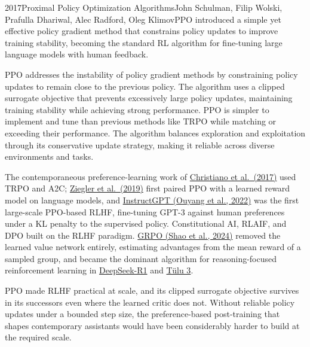 
\begin{papersummary}{2017}{Proximal Policy Optimization Algorithms}{John Schulman, Filip Wolski, Prafulla Dhariwal, Alec Radford, Oleg Klimov}{PPO introduced a simple yet effective policy gradient method that constrains policy updates to improve training stability, becoming the standard RL algorithm for fine-tuning large language models with human feedback.}

PPO addresses the instability of policy gradient methods by constraining policy updates to remain close to the previous policy. The algorithm uses a clipped surrogate objective that prevents excessively large policy updates, maintaining training stability while achieving strong performance. PPO is simpler to implement and tune than previous methods like TRPO while matching or exceeding their performance. The algorithm balances exploration and exploitation through its conservative update strategy, making it reliable across diverse environments and tasks.

The contemporaneous preference-learning work of \hyperref[paper:christiano-2017-rlhf]{Christiano et al.\ (2017)} used TRPO and A2C; \hyperref[paper:ziegler-2019]{Ziegler et al.\ (2019)} first paired PPO with a learned reward model on language models, and \hyperref[paper:ouyang-2022]{InstructGPT (Ouyang et al., 2022)} was the first large-scale PPO-based RLHF, fine-tuning GPT-3 against human preferences under a KL penalty to the supervised policy. Constitutional AI, RLAIF, and DPO built on the RLHF paradigm. \hyperref[paper:shao-2024-grpo]{GRPO (Shao et al., 2024)} removed the learned value network entirely, estimating advantages from the mean reward of a sampled group, and became the dominant algorithm for reasoning-focused reinforcement learning in \hyperref[paper:deepseek-2025-r1]{DeepSeek-R1} and \hyperref[paper:lambert-2024-tulu3]{T\"ulu 3}.

PPO made RLHF practical at scale, and its clipped surrogate objective survives in its successors even where the learned critic does not. Without reliable policy updates under a bounded step size, the preference-based post-training that shapes contemporary assistants would have been considerably harder to build at the required scale.

\end{papersummary}
